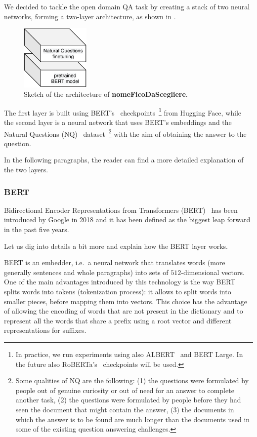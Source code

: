 \documentclass[10pt,hidelinks]{article}
\newcommand{\nomefico}{\textbf{nomeFicoDaScegliere}}
\begin{document}
We decided to tackle the open domain QA task by creating a stack of two neural networks, forming a two-layer architecture, as shown in .

\begin{figure}[ht!]
    \centering
    \includegraphics[width=0.3\textwidth]{pics/broad_architecture.pdf}
    \caption{Sketch of the architecture of \nomefico.}\label{fig:broad_architecture}
\end{figure}

The first layer is built using BERT's~\cite{devlin2018bert} checkpoints~\footnote{In practice, we run experiments using also ALBERT~\cite{albert} and BERT Large. In the future also RoBERTa's~\cite{roberta} checkpoints will be used.} from Hugging Face, while the second layer is a neural network that uses BERT's embeddings and the Natural Questions (NQ)~\cite{kwiatowski} dataset~\footnote{Some qualities of NQ are the following: (1) the questions were formulated by people out of genuine curiosity or out of need for an answer to complete another task, (2) the questions were formulated by people before they had seen the document that might contain the answer, (3) the documents in which the answer is to be found are much longer than the documents used in some of the existing question answering challenges.} with the aim of obtaining the answer to the question.

In the following paragraphs, the reader can find a more detailed explanation of the two layers.

\subsubsection{BERT}\label{subsubsec:bert}
Bidirectional Encoder Representations from Transformers (BERT)~\cite{devlin2018bert}  has been introduced by Google in 2018 and it has been defined as the biggest leap forward in the past five years.

Let us dig into details a bit more and explain how the BERT layer works.

BERT is an embedder, i.e.~a neural network that translates words (more generally sentences and whole paragraphs) into sets of $512$-dimensional vectors.
One of the main advantages introduced by this technology is the way BERT splits words into tokens (tokenization process): it allows to split words into smaller pieces, before mapping them into vectors.
This choice has the advantage of allowing the encoding of words that are not present in the dictionary and to represent all the words that share a prefix using a root vector and different representations for suffixes.
\end{document}
